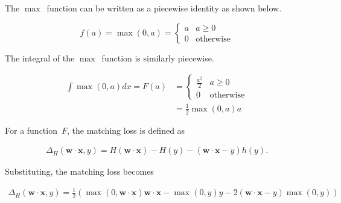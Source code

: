 \documentclass{report}
\newcommand{\w}{\mathbf{w}}
\newcommand{\xvec}{\mathbf{x}}
\newcommand{\wx}{\w\cdot\xvec}
\begin{document}
  The $\max$~function can be written as a piecewise identity as shown below.
  
  \begin{equation}
    f(a) = \max(0,a)= \left\{
                        \begin{array}{ll}
                          a & a \geq 0\\
                          0 & \text{otherwise}
                        \end{array}
                      \right.
  \end{equation}
 
  \noindent
  The integral of the $\max$~function is similarly piecewise.

  \begin{align}
     \int \max(0,a) dx = F(a) &=  \left\{
                                    \begin{array}{cl}
                                      \frac{a^2}{2} & a \geq 0\\
                                      0 & \text{otherwise}
                                    \end{array}
                                  \right.\\
                              &=  \frac{1}{2}\max(0,a)a
  \end{align}

  For a function~$F$, the matching loss is defined as
  
  \begin{align}
    \Delta_{H}(\wx, y) = H(\wx) - H(y) - (\wx - y)h(y)\textrm{.}
  \end{align}

  Substituting, the matching loss becomes
  
  \begin{align}
    \boxed{\Delta_{H}(\wx, y) = \frac{1}{2}\left( \max(0,\wx)\wx - \max(0,y)y - 2(\wx -y)\max(0,y) \right)}
  \end{align}
\end{document}
